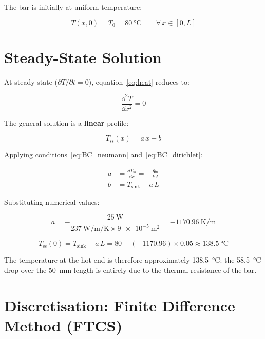 \documentclass[11pt, a4paper]{scrartcl}
\begin{document}
\begin{onehalfspace}
The bar is initially at uniform temperature:

\begin{equation}
  T(x, 0) = T_0 = \SI{80}{\celsius} \qquad \forall\, x \in [0, L]
  \label{eq:IC}
\end{equation}

\section{Steady-State Solution}

At steady state ($\partial T / \partial t = 0$), equation~\eqref{eq:heat} reduces to:

\begin{equation}
  \frac{\dd^2 T}{\dd x^2} = 0
  \label{eq:laplace1D}
\end{equation}

The general solution is a \textbf{linear} profile:

\begin{equation}
  T_\text{ss}(x) = a\, x + b
  \label{eq:lin}
\end{equation}

Applying conditions~\eqref{eq:BC_neumann} and~\eqref{eq:BC_dirichlet}:

\begin{align}
  a &= \frac{\dd T_\text{ss}}{\dd x} = -\frac{q_\text{in}}{k A} \label{eq:a}\\[6pt]
  b &= T_\text{sink} - a\, L \label{eq:b}
\end{align}

Substituting numerical values:

\begin{equation}
  a = -\frac{\SI{25}{\watt}}{\SI{237}{\watt\per\meter\per\kelvin} \times \SI{9e-5}{\meter\squared}}
    = \SI{-1170.96}{\kelvin\per\meter}
\end{equation}

\begin{equation}
  T_\text{ss}(0) = T_\text{sink} - a\,L = 80 - (-1170.96) \times 0.05 \approx \SI{138.5}{\celsius}
\end{equation}

The temperature at the hot end is therefore approximately \SI{138.5}{\celsius}: the \SI{58.5}{\celsius} drop over the \SI{50}{\milli\meter} length is entirely due to the thermal resistance of the bar.

\section{Discretisation: Finite Difference Method (FTCS)}


\end{onehalfspace}
\end{document}
